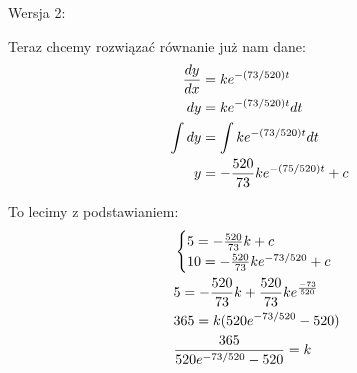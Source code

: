 \documentclass{article}
\begin{document}
{\color{dark-green}Wersja 2:}

Teraz chcemy rozwiązać równanie już nam dane:
\begin{align*}
    {dy\over dx}&=ke^{-(73/520) t}\\
    dy&=ke^{-(73/520)t}dt\\
    \int dy&=\int ke^{-(73/520)t}dt\\
    y&=-{520\over 73}ke^{-(75/520)t}+c
\end{align*}

To lecimy z podstawianiem:
\begin{align*}
    &\begin{cases}
        5=-{520\over73}k+c\\
        10=-{520\over73}ke^{-73/520}+c
    \end{cases}\\
    &5=-{520\over73}k+{520\over73}ke^{-73\over520}\\
    &365=k(520e^{-73/520}-520)\\
    &{365\over 520e^{-73/520}-520}=k
\end{align*}
\end{document}
